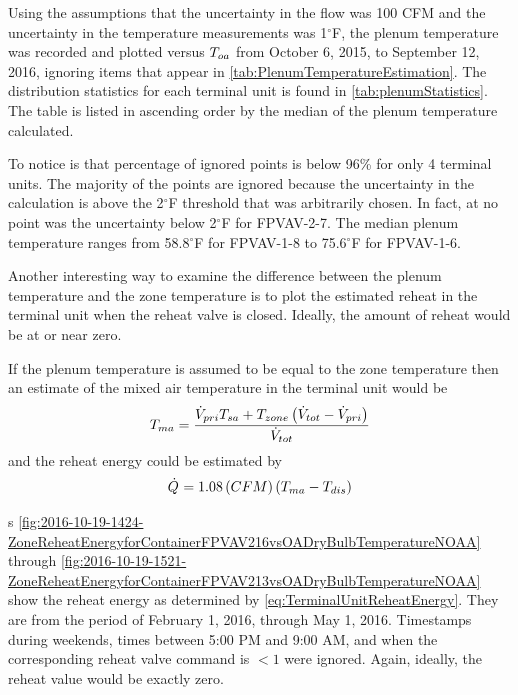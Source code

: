 Using the assumptions that the uncertainty in the flow was 100 CFM and
the uncertainty in the temperature measurements was 1\(^\circ\)F, the
plenum temperature was recorded and plotted versus \(T_{oa}\) from October
6, 2015, to September 12, 2016, ignoring items that appear in \tableref{}
\ref{tab:PlenumTemperatureEstimation}. The distribution statistics for
each terminal unit is found in \tableref{} \ref{tab:plenumStatistics}.
The table is listed in ascending order by the median of the plenum
temperature calculated.

To notice is that percentage of ignored points is below 96\% for only 4
terminal units.  The majority of the points are ignored because the
uncertainty in the calculation is above the 2\(^\circ\)F threshold that
was arbitrarily chosen.  In fact, at no point was the uncertainty below
2\(^\circ\)F for FPVAV-2-7.  The median plenum temperature ranges from
58.8\(^\circ\)F for FPVAV-1-8 to 75.6\(^\circ\)F for FPVAV-1-6.

Another interesting way to examine the difference between the plenum
temperature and the zone temperature is to plot the estimated reheat in
the terminal unit when the reheat valve is closed.  Ideally, the amount
of reheat would be at or near zero. 

If the plenum temperature is assumed to be equal to the zone temperature
then an estimate of the mixed air temperature in the terminal unit would
be
\begin{equation}
    T_{ma} = \frac{\dot{V}_{pri} T_{sa} + T_{zone} \left( \dot{V}_{tot} - \dot{V}_{pri} \right) }{ \dot{V}_{tot}}
    \label{eq:TerminalUnitMixedAirTemp}
\end{equation}
and the reheat energy could be estimated by
\begin{equation}
    \dot{Q}_{} = 1.08 \left( CFM \right) \left( T_{ma} - T_{dis}  \right)
    \label{eq:TerminalUnitReheatEnergy}
\end{equation}

\figref{}s
\ref{fig:2016-10-19-1424-ZoneReheatEnergyforContainerFPVAV216vsOADryBulbTemperatureNOAA}
through
\ref{fig:2016-10-19-1521-ZoneReheatEnergyforContainerFPVAV213vsOADryBulbTemperatureNOAA}
show the reheat energy as determined by 
\ref{eq:TerminalUnitReheatEnergy}. They are from the period of February
1, 2016, through May 1, 2016.  Timestamps during weekends, times between
5:00 PM and 9:00 AM, and when the corresponding reheat valve command is
\( < 1 \) were ignored. Again, ideally, the reheat value would be
exactly zero.


